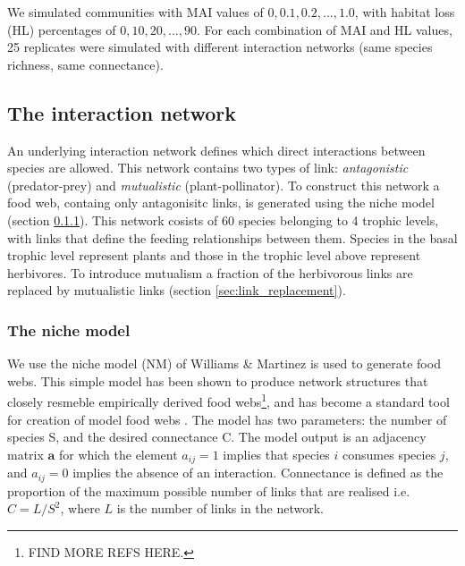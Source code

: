 We simulated communities with MAI values of $0, 0.1, 0.2,..., 1.0$, with habitat loss (HL) percentages of $0, 10, 20, ...,90$. For each combination of MAI and HL values, 25 replicates were simulated with different interaction networks (same species richness, same connectance).


\subsection{The interaction network}
\label{sec:interaction_network}


An underlying interaction network defines which direct interactions between species are allowed. This network contains two types of link: \emph{antagonistic} (predator-prey) and \emph{mutualistic} (plant-pollinator). To construct this network a food web, containg only antagonisitc links, is generated using the niche model (section \ref{sec:niche_model}). This network cosists of 60 species belonging to 4 trophic levels, with links that define the feeding relationships between them. Species in the basal trophic level represent plants and those in the trophic level above represent herbivores. To introduce mutualism a fraction of the herbivorous links are replaced by mutualistic links (section \ref{sec:link_replacement}). 


\subsubsection{The niche model}
\label{sec:niche_model}


We use the niche model (NM) of Williams \& Martinez \cite{williams2000simple} is used to generate food webs. This simple model has been shown to produce network structures that closely resmeble empirically derived food webs\footnote{FIND MORE REFS HERE.}, and has become a standard tool for creation of model food webs \cite{williams2000simple, dunne2002food, stouffer2005quantitative}. The model has two parameters: the number of species S, and the desired connectance C. The model output is an adjacency matrix $\mathbf{a}$ for which the element $a_{ij} = 1$ implies that species $i$ consumes species $j$, and $a_{ij} = 0$ implies the absence of an interaction. Connectance is defined as the proportion of the maximum possible number of links that are realised i.e. $C = L/S^2$, where $L$ is the number of links in the network.

